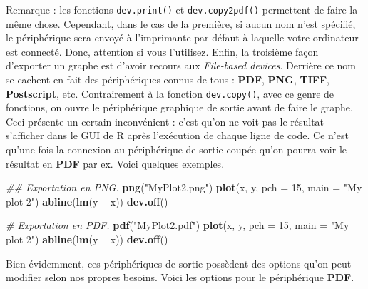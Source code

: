 \documentclass[]{article}
\newenvironment{Shaded}{\begin{snugshade}}{\end{snugshade}}
\newcommand{\CommentTok}[1]{\textcolor[rgb]{0.56,0.35,0.01}{\textit{#1}}}
\newcommand{\DataTypeTok}[1]{\textcolor[rgb]{0.13,0.29,0.53}{#1}}
\newcommand{\DecValTok}[1]{\textcolor[rgb]{0.00,0.00,0.81}{#1}}
\newcommand{\KeywordTok}[1]{\textcolor[rgb]{0.13,0.29,0.53}{\textbf{#1}}}
\newcommand{\NormalTok}[1]{#1}
\newcommand{\OperatorTok}[1]{\textcolor[rgb]{0.81,0.36,0.00}{\textbf{#1}}}
\newcommand{\StringTok}[1]{\textcolor[rgb]{0.31,0.60,0.02}{#1}}
\begin{document}
Remarque : les fonctions \texttt{dev.print()} et \texttt{dev.copy2pdf()} permettent de faire la même chose. Cependant, dans le cas de la première, si aucun nom n'est spécifié, le périphérique sera envoyé à l'imprimante par défaut à laquelle votre ordinateur est connecté. Donc, attention si vous l'utilisez.
Enfin, la troisième façon d'exporter un graphe est d'avoir recours aux \emph{File-based devices}. Derrière ce nom se cachent en fait des périphériques connus de tous : \textbf{PDF}, \textbf{PNG}, \textbf{TIFF}, \textbf{Postscript}, etc. Contrairement à la fonction \texttt{dev.copy()}, avec ce genre de fonctions, on ouvre le périphérique graphique de sortie avant de faire le graphe. Ceci présente un certain inconvénient : c'est qu'on ne voit pas le résultat s'afficher dans le GUI de R après l'exécution de chaque ligne de code. Ce n'est qu'une fois la connexion au périphérique de sortie coupée qu'on pourra voir le résultat en \textbf{PDF} par ex.
Voici quelques exemples.

\begin{Shaded}
\begin{Highlighting}[]
\CommentTok{## Exportation en PNG.}
\KeywordTok{png}\NormalTok{(}\StringTok{"MyPlot2.png"}\NormalTok{)}
\KeywordTok{plot}\NormalTok{(x, y, }\DataTypeTok{pch =} \DecValTok{15}\NormalTok{, }\DataTypeTok{main =} \StringTok{"My plot 2"}\NormalTok{)}
\KeywordTok{abline}\NormalTok{(}\KeywordTok{lm}\NormalTok{(y }\OperatorTok{~}\StringTok{ }\NormalTok{x))}
\KeywordTok{dev.off}\NormalTok{()}
\end{Highlighting}
\end{Shaded}

\begin{Shaded}
\begin{Highlighting}[]
\CommentTok{# Exportation en PDF.}
\KeywordTok{pdf}\NormalTok{(}\StringTok{"MyPlot2.pdf"}\NormalTok{)}
\KeywordTok{plot}\NormalTok{(x, y, }\DataTypeTok{pch =} \DecValTok{15}\NormalTok{, }\DataTypeTok{main =} \StringTok{"My plot 2"}\NormalTok{)}
\KeywordTok{abline}\NormalTok{(}\KeywordTok{lm}\NormalTok{(y }\OperatorTok{~}\StringTok{ }\NormalTok{x))}
\KeywordTok{dev.off}\NormalTok{()}
\end{Highlighting}
\end{Shaded}

Bien évidemment, ces périphériques de sortie possèdent des options qu'on peut modifier selon nos propres besoins. Voici les options pour le périphérique \textbf{PDF}.
\end{document}
